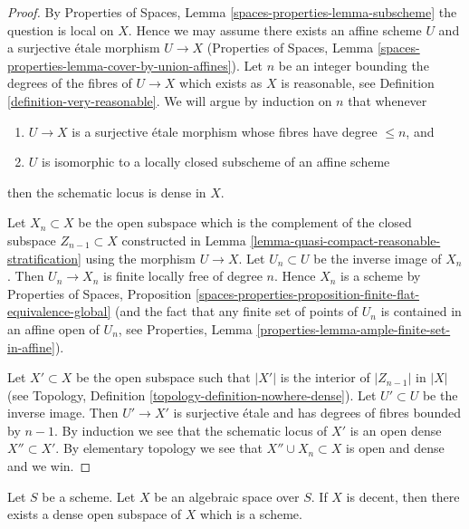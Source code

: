 \begin{proof}
By Properties of Spaces,
Lemma \ref{spaces-properties-lemma-subscheme}
the question is local on $X$. Hence we may assume there exists an affine
scheme $U$ and a surjective \'etale morphism $U \to X$
(Properties of Spaces, Lemma
\ref{spaces-properties-lemma-cover-by-union-affines}).
Let $n$ be an integer bounding the degrees of the fibres of $U \to X$
which exists as $X$ is reasonable, see
Definition \ref{definition-very-reasonable}.
We will argue by induction on $n$ that whenever
\begin{enumerate}
\item $U \to X$ is a surjective \'etale morphism whose fibres have
degree $\leq n$, and
\item $U$ is isomorphic to a locally closed subscheme of an affine scheme
\end{enumerate}
then the schematic locus is dense in $X$.

\medskip\noindent
Let $X_n \subset X$ be the open subspace which is the complement of the
closed subspace $Z_{n - 1} \subset X$ constructed in
Lemma \ref{lemma-quasi-compact-reasonable-stratification}
using the morphism $U \to X$.
Let $U_n \subset U$ be the inverse image of $X_n$. Then
$U_n \to X_n$ is finite locally free of degree $n$.
Hence $X_n$ is a scheme by
Properties of Spaces, Proposition
\ref{spaces-properties-proposition-finite-flat-equivalence-global}
(and the fact that any finite set of points of $U_n$ is contained in
an affine open of $U_n$, see
Properties, Lemma \ref{properties-lemma-ample-finite-set-in-affine}).

\medskip\noindent
Let $X' \subset X$ be the open subspace such that $|X'|$ is the
interior of $|Z_{n - 1}|$ in $|X|$ (see
Topology, Definition \ref{topology-definition-nowhere-dense}).
Let $U' \subset U$ be the inverse image. Then $U' \to X'$ is surjective
\'etale and has degrees of fibres bounded by $n - 1$. By induction
we see that the schematic locus of $X'$ is an open dense $X'' \subset X'$.
By elementary topology we see that $X'' \cup X_n \subset X$ is
open and dense and we win.
\end{proof}

\begin{theorem}
\label{theorem-decent-open-dense-scheme}
Let $S$ be a scheme. Let $X$ be an algebraic space over $S$.
If $X$ is decent, then there exists a dense open subspace
of $X$ which is a scheme.
\end{theorem}

